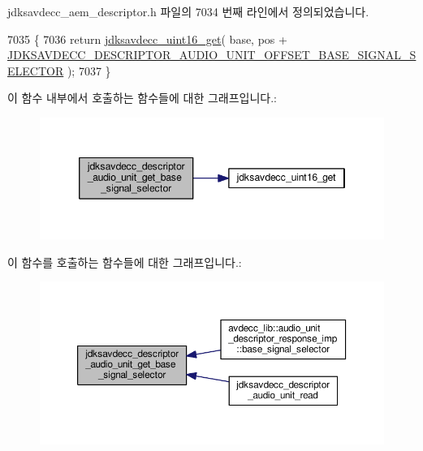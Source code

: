 jdksavdecc\+\_\+aem\+\_\+descriptor.\+h 파일의 7034 번째 라인에서 정의되었습니다.


\begin{DoxyCode}
7035 \{
7036     \textcolor{keywordflow}{return} \hyperlink{group__endian_ga3fbbbc20be954aa61e039872965b0dc9}{jdksavdecc\_uint16\_get}( base, pos + 
      \hyperlink{group__descriptor__audio_ga83b9dd6047c4a1360160ec7109c2ed1a}{JDKSAVDECC\_DESCRIPTOR\_AUDIO\_UNIT\_OFFSET\_BASE\_SIGNAL\_SELECTOR}
       );
7037 \}
\end{DoxyCode}


이 함수 내부에서 호출하는 함수들에 대한 그래프입니다.\+:
\nopagebreak
\begin{figure}[H]
\begin{center}
\leavevmode
\includegraphics[width=346pt]{group__descriptor__audio_ga328bab081bcc637cf7cd4bac37d0dbc4_cgraph}
\end{center}
\end{figure}




이 함수를 호출하는 함수들에 대한 그래프입니다.\+:
\nopagebreak
\begin{figure}[H]
\begin{center}
\leavevmode
\includegraphics[width=350pt]{group__descriptor__audio_ga328bab081bcc637cf7cd4bac37d0dbc4_icgraph}
\end{center}
\end{figure}


